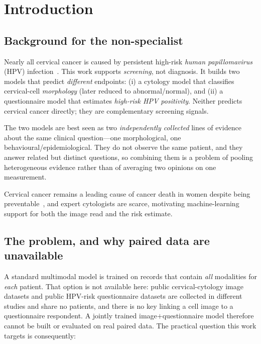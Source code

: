\documentclass[sigplan,nonacm,screen]{acmart}
\begin{document}
\section{Introduction}
\subsection{Background for the non-specialist}
\begin{defbox}
Nearly all cervical cancer is caused by persistent high-risk \emph{human papillomavirus} (HPV)
infection~\cite{walboomers1999}. This work supports \emph{screening}, not diagnosis. It builds two models that
predict \emph{different} endpoints: (i) a cytology model that classifies cervical-cell \emph{morphology}
(later reduced to abnormal/normal), and (ii) a questionnaire model that estimates \emph{high-risk HPV
positivity}. Neither predicts cervical cancer directly; they are complementary screening signals.
\end{defbox}

\begin{exbox}
The two models are best seen as two \emph{independently collected} lines of evidence about the same clinical
question---one morphological, one behavioural/epidemiological. They do not observe the same patient, and they
answer related but distinct questions, so combining them is a problem of pooling heterogeneous evidence rather
than of averaging two opinions on one measurement.
\end{exbox}

Cervical cancer remains a leading cause of cancer death in women despite being preventable~\cite{sung2021},
and expert cytologists are scarce, motivating machine-learning support for both the image read and the
risk estimate.

\subsection{The problem, and why paired data are unavailable}
A standard multimodal model is trained on records that contain \emph{all} modalities for \emph{each} patient.
That option is not available here: public cervical-cytology image datasets and public HPV-risk questionnaire
datasets are collected in different studies and share no patients, and there is no key linking a cell image to
a questionnaire respondent. A jointly trained image$+$questionnaire model therefore cannot be built or
evaluated on real paired data. The practical question this work targets is consequently:
\end{document}
